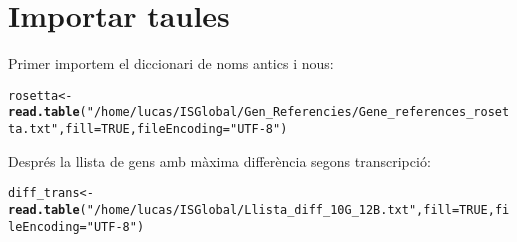 \documentclass{article}\usepackage[]{graphicx}\usepackage[]{color}
\makeatletter
\newcommand{\hlnum}[1]{\textcolor[rgb]{0.686,0.059,0.569}{#1}}%
\newcommand{\hlstr}[1]{\textcolor[rgb]{0.192,0.494,0.8}{#1}}%
\newcommand{\hlstd}[1]{\textcolor[rgb]{0.345,0.345,0.345}{#1}}%
\newcommand{\hlkwb}[1]{\textcolor[rgb]{0.69,0.353,0.396}{#1}}%
\newcommand{\hlkwc}[1]{\textcolor[rgb]{0.333,0.667,0.333}{#1}}%
\newcommand{\hlkwd}[1]{\textcolor[rgb]{0.737,0.353,0.396}{\textbf{#1}}}%
\newenvironment{kframe}{%
 \def\at@end@of@kframe{}%
 \ifinner\ifhmode%
  \def\at@end@of@kframe{\end{minipage}}%
  \begin{minipage}{\columnwidth}%
 \fi\fi%
 \def\FrameCommand##1{\hskip\@totalleftmargin \hskip-\fboxsep
 \colorbox{shadecolor}{##1}\hskip-\fboxsep
     \hskip-\linewidth \hskip-\@totalleftmargin \hskip\columnwidth}%
 \MakeFramed {\advance\hsize-\width
   \@totalleftmargin\z@ \linewidth\hsize
   \@setminipage}}%
 {\par\unskip\endMakeFramed%
 \at@end@of@kframe}
\newenvironment{knitrout}{}{} %
\makeatother
\begin{document}
\section{Importar taules}
Primer importem el diccionari de noms antics i nous:
\begin{knitrout}
\color{fgcolor}\begin{kframe}
\begin{alltt}
\hlstd{rosetta} \hlkwb{<-} \hlkwd{read.table}\hlstd{(}\hlstr{"/home/lucas/ISGlobal/Gen_Referencies/Gene_references_rosetta.txt"}\hlstd{,} \hlkwc{fill} \hlstd{=} \hlnum{TRUE}\hlstd{,} \hlkwc{fileEncoding} \hlstd{=} \hlstr{"UTF-8"}\hlstd{)}
\end{alltt}
\end{kframe}
\end{knitrout}
Després la llista de gens amb màxima differència segons transcripció:
\begin{knitrout}
\color{fgcolor}\begin{kframe}
\begin{alltt}
\hlstd{diff_trans} \hlkwb{<-} \hlkwd{read.table}\hlstd{(}\hlstr{"/home/lucas/ISGlobal/Llista_diff_10G_12B.txt"}\hlstd{,} \hlkwc{fill} \hlstd{=} \hlnum{TRUE}\hlstd{,} \hlkwc{fileEncoding} \hlstd{=} \hlstr{"UTF-8"}\hlstd{)}
\end{alltt}
\end{kframe}
\end{knitrout}
\end{document}
